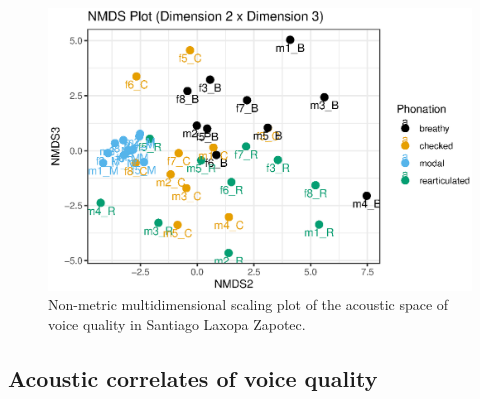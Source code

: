     \begin{figure}
        \centering
        \includegraphics{images/nmds23.eps}
        \caption{Non-metric multidimensional scaling plot of the acoustic space of voice quality in Santiago Laxopa Zapotec.}
        \label{fig:nmds23}
    \end{figure}

\subsection{Acoustic correlates of voice quality} \label{sec:acousticlandscape:correlates}

